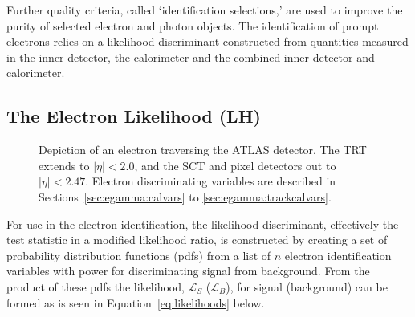 Further quality criteria, called `identification selections,' are used to improve the purity of selected electron and photon objects.
The identification of prompt electrons relies on a likelihood discriminant constructed from quantities measured in the inner detector, the calorimeter and the combined inner detector and calorimeter. 
\subsection{The Electron Likelihood (LH)}

\begin{figure}[tb]
  \centering
  \caption[Depiction of an electron traversing the ATLAS detector.
          The TRT extends to $|\eta|<2.0$, and the SCT and pixel detectors out to $|\eta|<2.47$.]
          {Depiction of an electron traversing the ATLAS detector.
          The TRT extends to $|\eta|<2.0$, and the SCT and pixel detectors out to $|\eta|<2.47$.
          Electron discriminating variables are described in Sections~\ref{sec:egamma:calvars} to \ref{sec:egamma:trackcalvars}.}
  \label{fig:egamma:LHvariablegraphic}
\end{figure}
For use in the electron identification, the likelihood discriminant, effectively the test statistic in a modified likelihood ratio, is constructed by creating a set of probability distribution functions (pdfs) from a list of $n$ electron identification variables with power for discriminating signal from background.
From the product of these pdfs the likelihood, $\mathcal{L}_{S}$ ($\mathcal{L}_{B}$), for signal (background) can be formed as is seen in Equation~\ref{eq:likelihoods} below.

